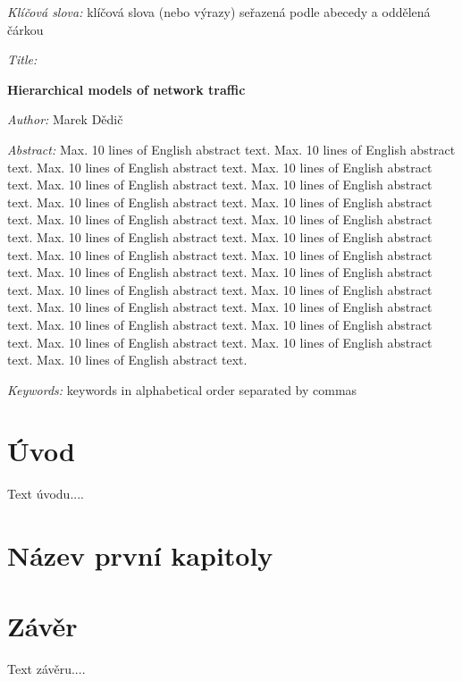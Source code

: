\documentclass[a4paper,11pt]{book}
\begin{document}
\bigskip

\noindent \textit{Klíčová slova:} klíčová slova (nebo výrazy) seřazená
podle abecedy a oddělená čárkou

\vfill

\begin{english}
	\begin{onehalfspace}
		\noindent \textit{Title:}

		\noindent \textbf{Hierarchical models of network traffic}
	\end{onehalfspace}

	\bigskip

	\noindent \textit{Author:} Marek Dědič

	\bigskip

	\noindent \textit{Abstract:} Max. 10 lines of English abstract text. Max. 10 lines of English abstract text. Max. 10 lines of English abstract text. Max. 10 lines of English abstract text. Max. 10 lines of English abstract text. Max. 10 lines of English abstract text. Max. 10 lines of English abstract text. Max. 10 lines of English abstract text. Max. 10 lines of English abstract text. Max. 10 lines of English abstract text. Max. 10 lines of English abstract text. Max. 10 lines of English abstract text. Max. 10 lines of English abstract text. Max. 10 lines of English abstract text. Max. 10 lines of English abstract text. Max. 10 lines of English abstract text. Max. 10 lines of English abstract text. Max. 10 lines of English abstract text. Max. 10 lines of English abstract text. Max. 10 lines of English abstract text. Max. 10 lines of English abstract text. Max. 10 lines of English abstract text. Max. 10 lines of English abstract text. Max. 10 lines of English abstract text. Max. 10 lines of English abstract text.

	\bigskip

	\noindent \textit{Keywords:} keywords in alphabetical order separated
	by commas

\end{english}

\newpage

\null\newpage

\pagestyle{plain}

\tableofcontents

\newpage

\chapter*{Úvod}

Text úvodu....

\chapter{Název první kapitoly}

\pagestyle{headings}

\chapter*{Závěr}

\pagestyle{plain}

Text závěru....

\nocite{*}
\printbibliography[title=Literatura]
\end{document}

